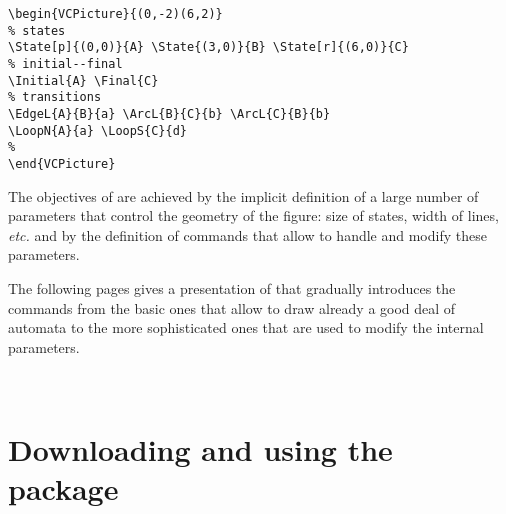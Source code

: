 \documentclass[11pt,twoside]{article}
\newlength{\parindenttemp} %
\newcommand{\noi}{\noindent}
\newcommand{\etc}{{\itshape etc.}\xspace } %
\newlength{\jsIndent}%
\newlength{\ColSource}%
\newlength{\ColFigur}%
\begin{document}
\noi 
\hspace*{-\jsIndent}
\begin{minipage}[t]{\ColFigur}%
\par\vspace*{0mm}%
\bigskip 
\begin{center}
%
\end{center}
\end{minipage}%
\hspace*{1.2em}%
\begin{minipage}[t]{\ColSource}
\setlength{\parindent}{\parindenttemp}%
\par\vspace*{0mm}%
\footnotesize
\begin{verbatim}
\begin{VCPicture}{(0,-2)(6,2)}
% states
\State[p]{(0,0)}{A} \State{(3,0)}{B} \State[r]{(6,0)}{C}
% initial--final
\Initial{A} \Final{C}
% transitions 
\EdgeL{A}{B}{a} \ArcL{B}{C}{b} \ArcL{C}{B}{b}
\LoopN{A}{a} \LoopS{C}{d}
%
\end{VCPicture}
\end{verbatim}
\normalsize
\end{minipage}%

\bigskip \bigskip

The objectives of \VCSG are achieved by the implicit definition of a 
large number of  
parameters that control the geometry of the figure: size of states, 
width of lines, \etc 
and by the definition of commands that allow to 
handle and modify these parameters.

The following pages gives a presentation of \VCSG that 
gradually introduces the commands from the basic ones that allow 
to draw already a good deal of automata to the more 
sophisticated ones that are used to modify the internal parameters.



\setcounter{tocdepth}{1}
~
{\small
\tableofcontents      
}


\newpage
\addtocounter{section}{-1}
\section{Downloading and using the package}\label{sec.d}
\end{document}
